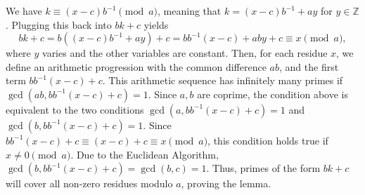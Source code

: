 \documentclass{article}
\newcommand{\Z}{\mathbb{Z}}
\begin{document}
We have $k \equiv (x-c)b^{-1} \pmod a$, meaning that $k = (x-c)b^{-1} + ay$ for $y \in \Z$. Plugging this back into $bk+c$ yields \[bk+c = b((x-c)b^{-1}+ay)+c = bb^{-1}(x-c) + aby+c \equiv x \pmod a,\] where $y$ varies and the other variables are constant. Then, for each residue $x$, we define an arithmetic progression with the common difference $ab$, and the first term $bb^{-1}(x-c)+c$. This arithmetic sequence has infinitely many primes if \\ $\gcd(ab, bb^{-1}(x-c)+c) = 1$. Since $a, b$ are coprime, the condition above is equivalent to the two conditions $\gcd(a, bb^{-1}(x-c)+c)=1$ and \\$\gcd(b, bb^{-1}(x-c)+c)=1$. Since $bb^{-1}(x-c)+c \equiv (x-c)+c \equiv x \pmod a$, this condition holds true if $x \neq 0 \pmod a$. Due to the Euclidean Algorithm, $\gcd(b, bb^{-1}(x-c)+c) = \gcd(b, c)=1$. Thus, primes of the form $bk+c$ will cover all non-zero residues modulo $a$, proving the lemma. \qedsymbol
\end{document}
